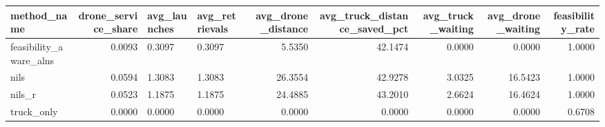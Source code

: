 \begin{tabular}{lrllrrrrr}
\toprule
method_name & drone_service_share & avg_launches & avg_retrievals & avg_drone_distance & avg_truck_distance_saved_pct & avg_truck_waiting & avg_drone_waiting & feasibility_rate \\
\midrule
feasibility_aware_alns & 0.0093 & 0.3097 & 0.3097 & 5.5350 & 42.1474 & 0.0000 & 0.0000 & 1.0000 \\
nils & 0.0594 & 1.3083 & 1.3083 & 26.3554 & 42.9278 & 3.0325 & 16.5423 & 1.0000 \\
nils_r & 0.0523 & 1.1875 & 1.1875 & 24.4885 & 43.2010 & 2.6624 & 16.4624 & 1.0000 \\
truck_only & 0.0000 & 0.0000 & 0.0000 & 0.0000 & 0.0000 & 0.0000 & 0.0000 & 0.6708 \\
\bottomrule
\end{tabular}
